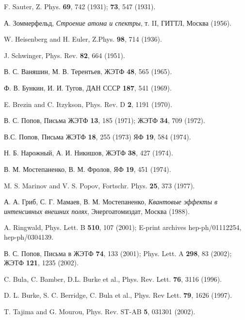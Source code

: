 \begin{thebibliography}{99}                    %

F. Sauter, Z. Phys. \textbf{69}, 742 (1931); \textbf{73}, 547
(1931).

А. Зоммерфельд, \emph{Строение атома и спектры}, т. II, ГИТТЛ,
Москва (1956).

W. Heisenberg and H. Euler, Z.Phys. \textbf{98}, 714 (1936).

J. Schwinger, Phys. Rev. \textbf{82}, 664 (1951).

В. С. Ваняшин, М. В. Терентьев, ЖЭТФ \textbf{48}, 565 (1965).

Ф. В. Бункин, И. И. Тугов, ДАН СССР \textbf{187}, 541 (1969).

E. Brezin and C. Itzykson, Phys. Rev. D \textbf{2}, 1191 (1970).

В. С. Попов, Письма ЖЭТФ \textbf{13}, 185 (1971); ЖЭТФ \textbf{34},
709 (1972).

В.С. Попов, Письма ЖЭТФ \textbf{18}, 255 (1973) ЯФ \textbf{19}, 584
(1974).

Н. Б. Нарожный, А. И. Никишов, ЖЭТФ \textbf{38}, 427 (1974).

В. М. Мостепаненко, В. М. Фролов, ЯФ \textbf{19}, 451 (1974).

M. S. Marinov and V. S. Popov, Fortschr. Phys. \textbf{25}, 373
(1977).

А. А. Гриб, С. Г. Мамаев, В. М. Мостепаненко, \emph{Квантовые
эффекты в интенсивных внешних полях}, Энергоатомиздат, Москва
(1988).

A. Ringwald, Phys. Lett. B \textbf{510}, 107 (2001); E-print
archives hep-ph/01112254, hep-ph/0304139.

В. С. Попов, Письма в ЖЭТФ \textbf{74}, 133 (2001); Phys. Lett. A
\textbf{298}, 83 (2002); ЖЭТФ \textbf{121}, 1235 (2002).

C. Bula, C. Bamber, D.L. Burke et al., Phys. Rev. Lett. \textbf{76},
3116 (1996).

D. L. Burke, S. C. Berridge, C. Bula et al., Phys. Rev Lett.
\textbf{79}, 1626 (1997).

T. Tajima and G. Mourou, Phys. Rev. ST-AB \textbf{5}, 031301 (2002).


\end{thebibliography}

